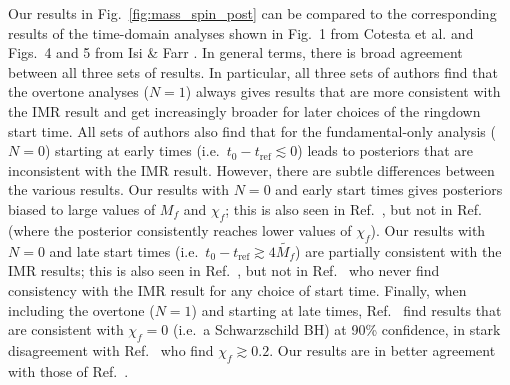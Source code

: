 Our results in Fig.~\ref{fig:mass_spin_post} can be compared to the corresponding results of the time-domain analyses shown in Fig.~1 from Cotesta et al. \cite{Cotesta:2022pci} and Figs.~4 and 5 from Isi \& Farr \cite{Isi:2022mhy}.
In general terms, there is broad agreement between all three sets of results. 
In particular, all three sets of authors find that the overtone analyses ($N=1$) always gives results that are more consistent with the IMR result and get increasingly broader for later choices of the ringdown start time.
All sets of authors also find that for the fundamental-only analysis ($N=0$) starting at early times (i.e.\ $t_0  - t_\mathrm{ref}\lesssim 0$) leads to posteriors that are inconsistent with the IMR result.
However, there are subtle differences between the various results.
Our results with $N=0$ and early start times gives posteriors biased to large values of $M_f$ and $\chi_f$; this is also seen in Ref.~\cite{Isi:2022mhy}, but not in Ref.~\cite{Cotesta:2022pci} (where the posterior consistently reaches lower values of $\chi_f$).
Our results with $N=0$ and late start times (i.e.\ $t_0 - t_\mathrm{ref}\gtrsim 4\tilde{M_f}$) are partially consistent with the IMR results; this is also seen in Ref.~\cite{Cotesta:2022pci}, but not in Ref.~\cite{Isi:2022mhy} who never find consistency with the IMR result for any choice of start time.
Finally, when including the overtone ($N=1$) and starting at late times, Ref.~\cite{Cotesta:2022pci} find results that are consistent with $\chi_f=0$ (i.e.\ a Schwarzschild BH) at 90\% confidence, in stark disagreement with Ref.~\cite{Isi:2022mhy} who find $\chi_f\gtrsim 0.2$. 
Our results are in better agreement with those of Ref.~\cite{Isi:2022mhy}.

